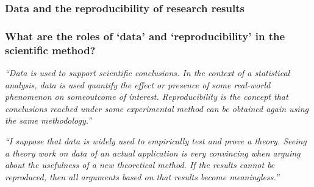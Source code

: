 \documentclass[12pt]{beamer}
\newcommand\ans[1]{{\it ``#1''}}
\newcommand\gap{\vspace{5mm}}
\begin{document}

\begin{frame}
\frametitle{ Data and the reproducibility of research results
}

\end{frame}

\begin{frame}
\frametitle{ What are the roles of `data' and `reproducibility' in the scientific method? }


\ans{Data is used to support scientific conclusions.  In the context of a statistical analysis, data is used quantify the effect or presence of some real-world phenomenon on someoutcome  of  interest.   Reproducibility  is  the  concept  that  conclusions  reached  under some experimental method can be obtained again using the same methodology.}

\gap

\ans{I suppose that data is widely used to empirically test and prove a theory.  Seeing a theory work on data of an actual application is very convincing when arguing about the usefulness of a new theoretical method.  If the results cannot be reproduced, then all arguments based on that results become meaningless.}








\end{frame}
\end{document}
